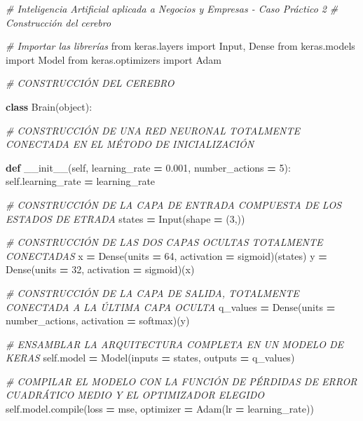 \documentclass[
]{book}
\newenvironment{Shaded}{\begin{snugshade}}{\end{snugshade}}
\newcommand{\BuiltInTok}[1]{#1}
\newcommand{\CommentTok}[1]{\textcolor[rgb]{0.56,0.35,0.01}{\textit{#1}}}
\newcommand{\DecValTok}[1]{\textcolor[rgb]{0.00,0.00,0.81}{#1}}
\newcommand{\FloatTok}[1]{\textcolor[rgb]{0.00,0.00,0.81}{#1}}
\newcommand{\FunctionTok}[1]{\textcolor[rgb]{0.00,0.00,0.00}{#1}}
\newcommand{\ImportTok}[1]{#1}
\newcommand{\KeywordTok}[1]{\textcolor[rgb]{0.13,0.29,0.53}{\textbf{#1}}}
\newcommand{\NormalTok}[1]{#1}
\newcommand{\OperatorTok}[1]{\textcolor[rgb]{0.81,0.36,0.00}{\textbf{#1}}}
\newcommand{\StringTok}[1]{\textcolor[rgb]{0.31,0.60,0.02}{#1}}
\newcommand{\VariableTok}[1]{\textcolor[rgb]{0.00,0.00,0.00}{#1}}
\begin{document}
\begin{Shaded}
\begin{Highlighting}[]
\CommentTok{\# Inteligencia Artificial aplicada a Negocios y Empresas {-} Caso Práctico 2}
\CommentTok{\# Construcción del cerebro}

\CommentTok{\# Importar las librerías}
\ImportTok{from}\NormalTok{ keras.layers }\ImportTok{import}\NormalTok{ Input, Dense}
\ImportTok{from}\NormalTok{ keras.models }\ImportTok{import}\NormalTok{ Model}
\ImportTok{from}\NormalTok{ keras.optimizers }\ImportTok{import}\NormalTok{ Adam}

\CommentTok{\# CONSTRUCCIÓN DEL CEREBRO}

\KeywordTok{class}\NormalTok{ Brain(}\BuiltInTok{object}\NormalTok{):}
    
    \CommentTok{\# CONSTRUCCIÓN DE UNA RED NEURONAL TOTALMENTE CONECTADA EN EL MÉTODO DE INICIALIZACIÓN}
    
    \KeywordTok{def} \FunctionTok{\_\_init\_\_}\NormalTok{(}\VariableTok{self}\NormalTok{, learning\_rate }\OperatorTok{=} \FloatTok{0.001}\NormalTok{, number\_actions }\OperatorTok{=} \DecValTok{5}\NormalTok{):}
        \VariableTok{self}\NormalTok{.learning\_rate }\OperatorTok{=}\NormalTok{ learning\_rate}
        
        \CommentTok{\# CONSTRUCCIÓN DE LA CAPA DE ENTRADA COMPUESTA DE LOS ESTADOS DE ETRADA}
\NormalTok{        states }\OperatorTok{=}\NormalTok{ Input(shape }\OperatorTok{=}\NormalTok{ (}\DecValTok{3}\NormalTok{,))}
        
        \CommentTok{\# CONSTRUCCIÓN DE LAS DOS CAPAS OCULTAS TOTALMENTE CONECTADAS}
\NormalTok{        x }\OperatorTok{=}\NormalTok{ Dense(units }\OperatorTok{=} \DecValTok{64}\NormalTok{, activation }\OperatorTok{=} \StringTok{\textquotesingle{}sigmoid\textquotesingle{}}\NormalTok{)(states)}
\NormalTok{        y }\OperatorTok{=}\NormalTok{ Dense(units }\OperatorTok{=} \DecValTok{32}\NormalTok{, activation }\OperatorTok{=} \StringTok{\textquotesingle{}sigmoid\textquotesingle{}}\NormalTok{)(x)}
        
        \CommentTok{\# CONSTRUCCIÓN DE LA CAPA DE SALIDA, TOTALMENTE CONECTADA A LA ÚLTIMA CAPA OCULTA}
\NormalTok{        q\_values }\OperatorTok{=}\NormalTok{ Dense(units }\OperatorTok{=}\NormalTok{ number\_actions, activation }\OperatorTok{=} \StringTok{\textquotesingle{}softmax\textquotesingle{}}\NormalTok{)(y)}
        
        \CommentTok{\# ENSAMBLAR LA ARQUITECTURA COMPLETA EN UN MODELO DE KERAS}
        \VariableTok{self}\NormalTok{.model }\OperatorTok{=}\NormalTok{ Model(inputs }\OperatorTok{=}\NormalTok{ states, outputs }\OperatorTok{=}\NormalTok{ q\_values)}
        
        \CommentTok{\# COMPILAR EL MODELO CON LA FUNCIÓN DE PÉRDIDAS DE ERROR CUADRÁTICO MEDIO Y EL OPTIMIZADOR ELEGIDO}
        \VariableTok{self}\NormalTok{.model.}\BuiltInTok{compile}\NormalTok{(loss }\OperatorTok{=} \StringTok{\textquotesingle{}mse\textquotesingle{}}\NormalTok{, optimizer }\OperatorTok{=}\NormalTok{ Adam(lr }\OperatorTok{=}\NormalTok{ learning\_rate))}
\end{Highlighting}
\end{Shaded}
\end{document}
